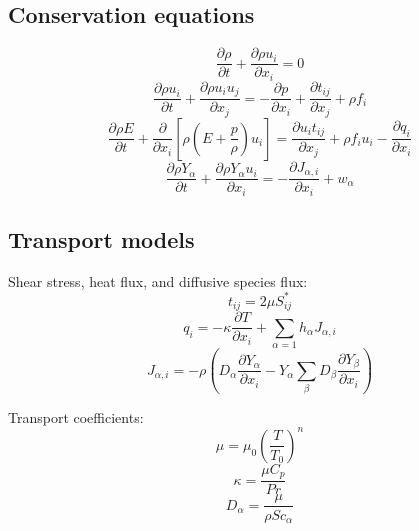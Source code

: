 \documentclass[oneside,a4paper,11pt]{report}
\begin{document}
\subsection{Conservation equations}
\begin{equation}
\frac{\partial \rho}{\partial t} + \frac{\partial \rho u_i}{\partial x_i} = 0
\end{equation}
\begin{equation}
\frac{\partial \rho u_i}{\partial t} + \frac{\partial \rho u_i u_j}{\partial x_j} = - \frac{\partial p}{\partial x_i} + \frac{\partial t_{ij}}{\partial x_j} + \rho f_i
\end{equation}
\begin{equation}
\frac{\partial \rho E}{\partial t} + \frac{\partial}{\partial x_i} \left [ \rho \left ( E + \frac{p}{\rho} \right ) u_i \right ] = \frac{\partial u_i t_{ij}}{\partial x_j} + \rho f_i u_i -  \frac{\partial q_i}{\partial x_i}
\end{equation}
\begin{equation}
\frac{\partial\rho Y_\alpha}{\partial t}+\frac{\partial \rho Y_\alpha u_i}{\partial x_i} = -\frac{\partial J_{\alpha,i}}{\partial x_i} + w_\alpha
\end{equation}

\subsection{Transport models}
Shear stress, heat flux, and diffusive species flux:
\begin{equation}
t_{ij} = 2\mu S_{ij}^*
\end{equation}
\begin{equation}
q_i = -\kappa \frac{\partial T}{\partial x_i}  + \sum_{\alpha=1} h_\alpha J_{\alpha,i}
\end{equation}
\begin{equation}
J_{\alpha,i} = -\rho \left ( D_\alpha \frac{\partial Y_\alpha}{\partial x_i} - Y_\alpha \sum_\beta D_\beta \frac{\partial Y_\beta}{\partial x_i} \right )
\end{equation}

Transport coefficients:
\begin{equation}
\mu = \mu_0 \left ( \frac{T}{T_0} \right )^n
\end{equation}
\begin{equation}
\kappa = \frac{\mu C_p}{Pr}
\end{equation}
\begin{equation}
D_\alpha = \frac{\mu}{\rho Sc_\alpha}
\end{equation}
\end{document}

